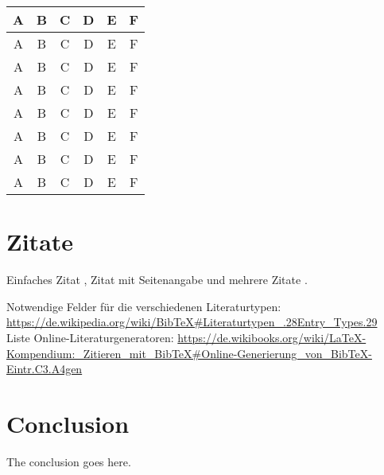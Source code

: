 \begin{table*}
\centering
\begin{tabular}{|c|c|c||c|c|c|}
\hline
A & B & C & D & E & F\\    \hline
A & B & C & D & E & F\\    \hline
A & B & C & D & E & F\\    \hline
A & B & C & D & E & F\\    \hline
A & B & C & D & E & F\\    \hline
A & B & C & D & E & F\\    \hline
A & B & C & D & E & F\\    \hline
A & B & C & D & E & F\\    \hline
\end{tabular}
\end{table*}


\section{Zitate}

Einfaches Zitat \cite{Madeyski2007OnTests}, Zitat mit Seitenangabe \cite[S. 15]{Erdogmus2005OnProgramming} und mehrere Zitate \cite{Holcombe2008SevenImprovement,Fucci2016ATest-Last,Causevic2013EffectsExperiment}.

Notwendige Felder für die verschiedenen Literaturtypen: \url{https://de.wikipedia.org/wiki/BibTeX#Literaturtypen_.28Entry_Types.29} \\
Liste Online-Literaturgeneratoren: \url{https://de.wikibooks.org/wiki/LaTeX-Kompendium:_Zitieren_mit_BibTeX\#Online-Generierung_von_BibTeX-Eintr.C3.A4gen}

\section{Conclusion}
The conclusion goes here.

